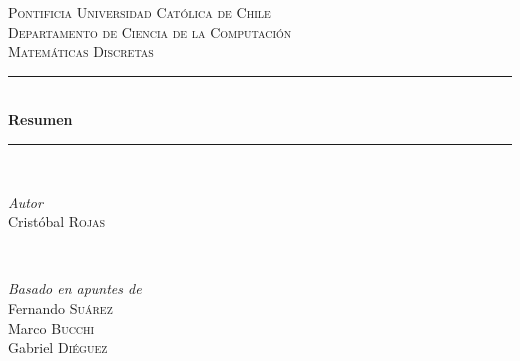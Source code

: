 \documentclass[letterpaper]{article}
\begin{document}

\begin{titlepage} %
    \newcommand{\HRule}{\rule{\linewidth}{0.5mm}} %

    \center %


    \textsc{\LARGE Pontificia Universidad Católica de Chile}\\[1.5cm] %

    \textsc{\Large Departamento de Ciencia de la Computación}\\[0.5cm] %

    \textsc{\large Matemáticas Discretas}\\[0.5cm] %


    \HRule\\[0.4cm]

    {\huge\bfseries Resumen}\\[0.4cm] %

    \HRule\\[1.5cm]


    \begin{minipage}{0.4\textwidth}
    	\begin{flushleft}
    		\large
    		\textit{Autor}\\
    		Cristóbal \textsc{Rojas} %
    	\end{flushleft}
    \end{minipage}
    ~
    \begin{minipage}{0.4\textwidth}
    	\begin{flushright}
    		\large
    		\textit{Basado en apuntes de}\\
    		Fernando \textsc{Suárez} \\
    		Marco \textsc{Bucchi} \\
            Gabriel \textsc{Diéguez}
    	\end{flushright}
    \end{minipage}


\end{titlepage}
\end{document}
